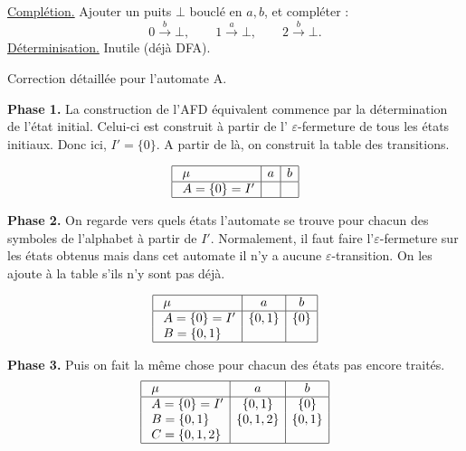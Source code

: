 \begin{corrections}
\begin{questions}
    \underline{Complétion.}
    Ajouter un puits $\bot$ bouclé en $a,b$, et compléter :
    \[
    0 \xrightarrow{b} \bot,\qquad
    1 \xrightarrow{a} \bot,\qquad
    2 \xrightarrow{b} \bot.
    \]
    \underline{Déterminisation.} Inutile (déjà DFA).

  \end{questions}

\end{corrections}



\begin{corrections}

  \begin{questions}
    
  \item Correction détaillée pour l'automate A.
    
    \textbf{Phase 1.}
    La construction de l'AFD équivalent commence par la détermination de l'état initial.
    Celui-ci est construit à partir de l' $\varepsilon$-fermeture de tous les états initiaux.
    Donc ici, $I'=\{0\}$. A partir de là, on construit la table des transitions.
    
    $$\begin{array}{| l | c | c|}
      \hline
      \  \mu & a & b \\
      \hline
      \  A = \{0\} = I' &  &  \\
      \hline
    \end{array}$$

    \textbf{Phase 2.}
    On regarde vers quels états l'automate se trouve pour chacun des symboles de l'alphabet à partir de $I'$.
    Normalement, il faut faire l'$\varepsilon$-fermeture sur les états obtenus mais dans cet automate il n'y a aucune $\varepsilon$-transition.
    On les ajoute à la table s'ils n'y sont pas déjà.

    $$\begin{array}{| l | c | c|}
      \hline
      \  \mu & a & b \\
      \hline
      \  A = \{0\} = I' & \{0,1\} & \{0\} \\
      \  B = \{0,1\} &  &  \\
      \hline
    \end{array}$$


    \textbf{Phase 3.}
    Puis on fait la même chose pour chacun des états pas encore traités.
    $$\begin{array}{| l | c | c|}
      \hline
      \  \mu & a & b \\
      \hline
      \  A = \{0\} = I' & \{0,1\} & \{0\} \\
      \  B = \{0,1\} &  \{0,1,2 \}& \{0,1\}  \\
      \  C = \{0,1,2\} &  &  \\
      \hline
    \end{array}$$


\end{questions}
\end{corrections}
